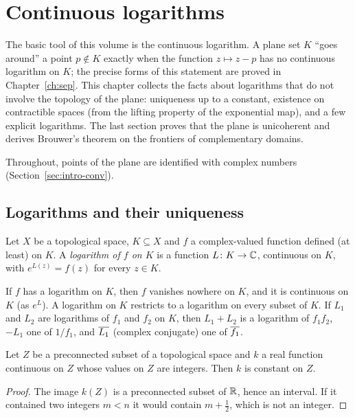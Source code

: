 \chapter{Continuous logarithms}\label{ch:log}

The basic tool of this volume is the continuous logarithm. A plane set $K$ ``goes around'' a point
$p\notin K$ exactly when the function $z\mapsto z-p$ has no continuous logarithm on $K$; the
precise forms of this statement are proved in Chapter~\ref{ch:sep}. This chapter collects the
facts about logarithms that do not involve the topology of the plane: uniqueness up to a constant,
existence on contractible spaces (from the lifting property of the exponential map), and a few
explicit logarithms. The last section proves that the plane is unicoherent and derives Brouwer's
theorem on the frontiers of complementary domains.

Throughout, points of the plane are identified with complex numbers (Section~\ref{sec:intro-conv}).

\section{Logarithms and their uniqueness}\label{sec:log-unique}

\begin{definition}\label{def:log}
Let $X$ be a topological space, $K\subseteq X$ and $f$ a complex-valued function defined (at
least) on $K$. A \emph{logarithm of $f$ on $K$} is a function $L\colon K\to\mathbb{C}$, continuous on $K$,
with $e^{L(z)}=f(z)$ for every $z\in K$.
\end{definition}

If $f$ has a logarithm on $K$, then $f$ vanishes nowhere on $K$, and it is continuous on $K$
(as $e^{L}$). A logarithm on $K$ restricts to a logarithm on every subset of $K$. If $L_1$ and
$L_2$ are logarithms of $f_1$ and $f_2$ on $K$, then $L_1+L_2$ is a logarithm of $f_1f_2$, $-L_1$
one of $1/f_1$, and $\overline{L_1}$ (complex conjugate) one of $\overline{f_1}$.

\begin{lemma}\label{lem:int-valued}
Let $Z$ be a preconnected subset of a topological space and $k$ a real function continuous on $Z$
whose values on $Z$ are integers. Then $k$ is constant on $Z$.
\end{lemma}

\begin{proof}
The image $k(Z)$ is a preconnected subset of $\mathbb{R}$, hence an interval. If it contained two integers
$m<n$ it would contain $m+\frac12$, which is not an integer.
\end{proof}

